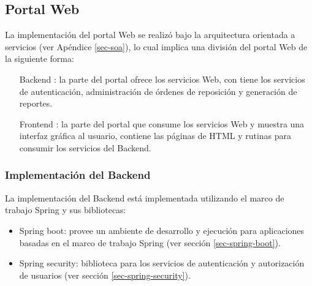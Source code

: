 \subsection{Portal Web}
La implementación del portal Web se realizó bajo la arquitectura orientada a servicios (ver Apéndice \ref{sec-soa}), lo cual implica una división del portal Web de la siguiente forma:
\begin{itemize}
	\item [Backend]: la parte del portal ofrece los servicios Web, con tiene los servicios de autenticación, administración de órdenes de reposición y generación de reportes.
	\item [Frontend]: la parte del portal que consume los servicios Web y muestra una interfaz gráfica al usuario, contiene las páginas de HTML y rutinas para consumir los servicios del Backend.
\end{itemize}

\subsubsection{Implementación del Backend}\label{sec-backend}
La implementación del Backend está implementada utilizando el marco de trabajo Spring y sus bibliotecas:
\begin{itemize}
 	\item Spring boot: provee un ambiente de desarrollo y ejecución para aplicaciones basadas en el marco de trabajo Spring (ver sección \ref{sec-spring-boot}). 
 	\item Spring security: biblioteca para los servicios de autenticación y autorización de usuarios (ver sección \ref{sec-spring-security}).
\end{itemize}

